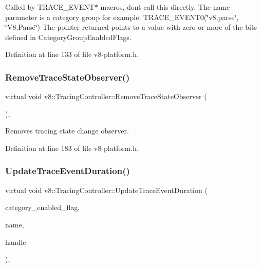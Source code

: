 Called by T\+R\+A\+C\+E\+\_\+\+E\+V\+E\+N\+T$\ast$ macros, don\textquotesingle{}t call this directly. The name parameter is a category group for example\+: T\+R\+A\+C\+E\+\_\+\+E\+V\+E\+N\+T0(\char`\"{}v8,parse\char`\"{}, \char`\"{}\+V8.\+Parse\char`\"{}) The pointer returned points to a value with zero or more of the bits defined in Category\+Group\+Enabled\+Flags. 

Definition at line 133 of file v8-\/platform.\+h.

\mbox{\label{classv8_1_1TracingController_ab8d5b3ac795188effb423fa2c0514353}} 
\subsubsection{\texorpdfstring{Remove\+Trace\+State\+Observer()}{RemoveTraceStateObserver()}}
{\footnotesize\ttfamily virtual void v8\+::\+Tracing\+Controller\+::\+Remove\+Trace\+State\+Observer (\begin{DoxyParamCaption}\item[{\mbox{\hyperlink{classv8_1_1TracingController_1_1TraceStateObserver}{Trace\+State\+Observer}} $\ast$}]{ }\end{DoxyParamCaption})\hspace{0.3cm}{\ttfamily [inline]}, {\ttfamily [virtual]}}

Removes tracing state change observer. 

Definition at line 183 of file v8-\/platform.\+h.

\mbox{\label{classv8_1_1TracingController_ac1fda6cdae5f6515b896b3df05d5a97e}} 
\subsubsection{\texorpdfstring{Update\+Trace\+Event\+Duration()}{UpdateTraceEventDuration()}}
{\footnotesize\ttfamily virtual void v8\+::\+Tracing\+Controller\+::\+Update\+Trace\+Event\+Duration (\begin{DoxyParamCaption}\item[{const uint8\+\_\+t $\ast$}]{category\+\_\+enabled\+\_\+flag,  }\item[{const char $\ast$}]{name,  }\item[{uint64\+\_\+t}]{handle }\end{DoxyParamCaption})\hspace{0.3cm}{\ttfamily [inline]}, {\ttfamily [virtual]}}

